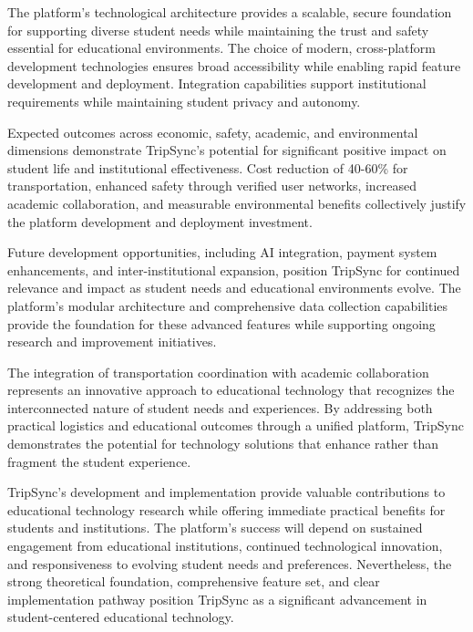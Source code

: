 \documentclass[conference]{IEEEtran}
\begin{document}
The platform's technological architecture provides a scalable, secure foundation for supporting diverse student needs while maintaining the trust and safety essential for educational environments. The choice of modern, cross-platform development technologies ensures broad accessibility while enabling rapid feature development and deployment. Integration capabilities support institutional requirements while maintaining student privacy and autonomy.

Expected outcomes across economic, safety, academic, and environmental dimensions demonstrate TripSync's potential for significant positive impact on student life and institutional effectiveness. Cost reduction of 40-60\% for transportation, enhanced safety through verified user networks, increased academic collaboration, and measurable environmental benefits collectively justify the platform development and deployment investment.

Future development opportunities, including AI integration, payment system enhancements, and inter-institutional expansion, position TripSync for continued relevance and impact as student needs and educational environments evolve. The platform's modular architecture and comprehensive data collection capabilities provide the foundation for these advanced features while supporting ongoing research and improvement initiatives.

The integration of transportation coordination with academic collaboration represents an innovative approach to educational technology that recognizes the interconnected nature of student needs and experiences. By addressing both practical logistics and educational outcomes through a unified platform, TripSync demonstrates the potential for technology solutions that enhance rather than fragment the student experience.

TripSync's development and implementation provide valuable contributions to educational technology research while offering immediate practical benefits for students and institutions. The platform's success will depend on sustained engagement from educational institutions, continued technological innovation, and responsiveness to evolving student needs and preferences. Nevertheless, the strong theoretical foundation, comprehensive feature set, and clear implementation pathway position TripSync as a significant advancement in student-centered educational technology.
\end{document}
